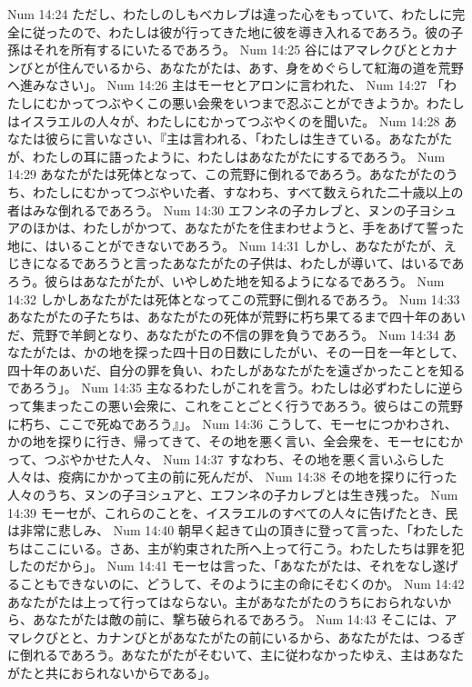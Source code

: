 Num 14:24  ただし、わたしのしもべカレブは違った心をもっていて、わたしに完全に従ったので、わたしは彼が行ってきた地に彼を導き入れるであろう。彼の子孫はそれを所有するにいたるであろう。
Num 14:25  谷にはアマレクびととカナンびとが住んでいるから、あなたがたは、あす、身をめぐらして紅海の道を荒野へ進みなさい」。
Num 14:26  主はモーセとアロンに言われた、
Num 14:27  「わたしにむかってつぶやくこの悪い会衆をいつまで忍ぶことができようか。わたしはイスラエルの人々が、わたしにむかってつぶやくのを聞いた。
Num 14:28  あなたは彼らに言いなさい、『主は言われる、「わたしは生きている。あなたがたが、わたしの耳に語ったように、わたしはあなたがたにするであろう。
Num 14:29  あなたがたは死体となって、この荒野に倒れるであろう。あなたがたのうち、わたしにむかってつぶやいた者、すなわち、すべて数えられた二十歳以上の者はみな倒れるであろう。
Num 14:30  エフンネの子カレブと、ヌンの子ヨシュアのほかは、わたしがかつて、あなたがたを住まわせようと、手をあげて誓った地に、はいることができないであろう。
Num 14:31  しかし、あなたがたが、えじきになるであろうと言ったあなたがたの子供は、わたしが導いて、はいるであろう。彼らはあなたがたが、いやしめた地を知るようになるであろう。
Num 14:32  しかしあなたがたは死体となってこの荒野に倒れるであろう。
Num 14:33  あなたがたの子たちは、あなたがたの死体が荒野に朽ち果てるまで四十年のあいだ、荒野で羊飼となり、あなたがたの不信の罪を負うであろう。
Num 14:34  あなたがたは、かの地を探った四十日の日数にしたがい、その一日を一年として、四十年のあいだ、自分の罪を負い、わたしがあなたがたを遠ざかったことを知るであろう」。
Num 14:35  主なるわたしがこれを言う。わたしは必ずわたしに逆らって集まったこの悪い会衆に、これをことごとく行うであろう。彼らはこの荒野に朽ち、ここで死ぬであろう』」。
Num 14:36  こうして、モーセにつかわされ、かの地を探りに行き、帰ってきて、その地を悪く言い、全会衆を、モーセにむかって、つぶやかせた人々、
Num 14:37  すなわち、その地を悪く言いふらした人々は、疫病にかかって主の前に死んだが、
Num 14:38  その地を探りに行った人々のうち、ヌンの子ヨシュアと、エフンネの子カレブとは生き残った。
Num 14:39  モーセが、これらのことを、イスラエルのすべての人々に告げたとき、民は非常に悲しみ、
Num 14:40  朝早く起きて山の頂きに登って言った、「わたしたちはここにいる。さあ、主が約束された所へ上って行こう。わたしたちは罪を犯したのだから」。
Num 14:41  モーセは言った、「あなたがたは、それをなし遂げることもできないのに、どうして、そのように主の命にそむくのか。
Num 14:42  あなたがたは上って行ってはならない。主があなたがたのうちにおられないから、あなたがたは敵の前に、撃ち破られるであろう。
Num 14:43  そこには、アマレクびとと、カナンびとがあなたがたの前にいるから、あなたがたは、つるぎに倒れるであろう。あなたがたがそむいて、主に従わなかったゆえ、主はあなたがたと共におられないからである」。
